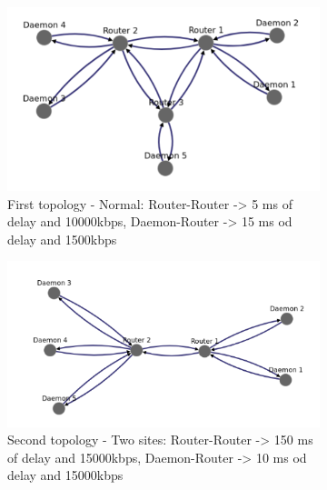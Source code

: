 \documentclass{eplmastersthesis}
\begin{document}
        \begin{figure}[H]
          \centering
          \begin{subfigure}{0.6\textwidth}
            \centering
            \includegraphics[width=1.0\linewidth]{figures/user_case/raft_topo_1.png}
            \caption{First topology - Normal: Router-Router -> 5 ms of delay and 10000kbps, Daemon-Router -> 15 ms od delay and 1500kbps}
            \label{fig:topo1}
          \end{subfigure}
          \centering
          \begin{subfigure}{0.6\textwidth}
            \centering
            \includegraphics[width=1.0\linewidth]{figures/user_case/raft_topo_2.png}
            \caption{Second topology - Two sites: Router-Router -> 150 ms of delay and 15000kbps, Daemon-Router -> 10 ms od delay and 15000kbps}
            \label{fig:topo2}
          \end{subfigure}
          \centering
          \begin{subfigure}{0.6\textwidth}
            \centering

\end{subfigure}
\end{figure}
\end{document}
